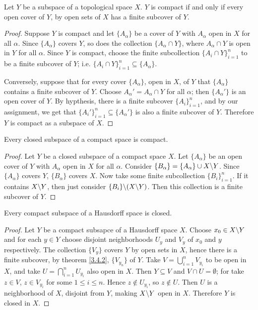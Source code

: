 \begin{lemma}\label{3.4.1}
    Let $Y$ be a subspace of a topological space  $X$.  $Y$ is compact if and only if every open
    cover of  $Y$, by open sets of  $X$ has a finite subcover of $Y$.
\end{lemma}
\begin{proof}
    Suppose $Y$ is compact and let  $\{A_\alpha\}$ be a cover of $Y$ with  $A_\alpha$ open in  $X$
    for all  $\alpha$. Since  $\{A_\alpha\}$ covers $Y$, so does the collection  $\{A_\alpha \cap
    Y\}$, where $A_\alpha \cap Y$ is open in  $Y$ for all  $\alpha$. Since  $Y$ is compact, choose
    the finite subcollection  $\{A_i \cap Y\}_{i=1}^{n}$ to be a finite subcover of $Y$; i.e.
    $\{A_i \cap Y\}_{i=1}^{n} \subseteq \{A_\alpha\}$.

    Conversely, suppose that for every cover $\{A_\alpha\}$, open in  $X$, of  $Y$ that
    $\{A_\alpha\}$ contains a finite subcover of $Y$. Choose  $A_\alpha'=A_\alpha \cap Y$ for all
    $\alpha$; then $\{A_\alpha'\}$ is an open cover of $Y$. 
    By hypthesis, there is a finite subcover $\{A_i\}_{i=1}^n$, and by our assignment, we
    get that $\{A_i'\}_{i=1}^n \subseteq \{A_\alpha'\}$ is also a finite subcover of $Y$. Therefore
     $Y$ is compact as a subspace of  $X$.
\end{proof}

\begin{theorem}\label{3.4.2}
    Every closed subspace of a compact space is compact.
\end{theorem}
\begin{proof}
    Let $Y$ be a closed subspace of a compact space $X$. Let $\{A_\alpha\}$ be an open cover of $Y$
    with  $A_\alpha$ open in  $X$ for all  $\alpha$. Consider  $\{B_\alpha\}=\{A_\alpha\} \cup
    X \backslash Y$. Since $\{A_\alpha\}$ covers $Y$,  $\{B_\alpha\}$ covers $X$. Now take some finite
    subcollection  $\{B_i\}_{i=1}^n$. If it contains $X \backslash Y$, then just consider
    $\{B_i\} \backslash (X \backslash Y)$. Then this collection is a finite subcover of $Y$.
\end{proof}

\begin{theorem}\label{3.4.3}
    Every compact subspace of a Hausdorff space is closed.
\end{theorem}
\begin{proof}
    Let $Y$ be a compact subsapce of a Hausdorff space  $X$. Choose  $x_0 \in X \backslash Y$ and for
    each $y \in Y$ choose disjoint neighborhoods  $U_y$ and  $V_y$ of  $ x_0$ and $y$ respectively.
    The collection  $\{V_y\}$ covers $Y$ by open sets in  $X$, hence there is a finite subcover, by
    theorem \ref {3.4.2}, $\{V_{y_n}\}$ of $Y$. Take  $V=\bigcup_{i=1}^n{V_{y_i}}$ to be open in
$X$, and take  $U=\bigcap_{i=1}^n{U_{y_i}}$ also open in $X$. Then  $Y \subseteq V$ and  $V \cap
U=\emptyset$; for take $z \in V$,  $z \in V_{y_i}$ for some $1 \leq i \leq n$. Hence  $z \notin
U_{y_i}$, so $z \notin U$. Then  $U$ is a neighborhood of  $X$, disjoint from  $Y$, making
$X \backslash Y$ open in $X$. Therefore  $Y$ is closed in  $X$.
\end{proof}

